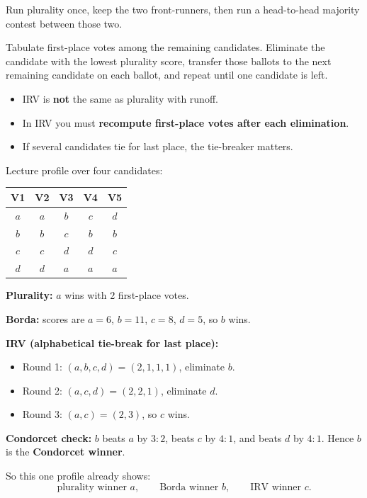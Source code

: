 \begin{defbox}
Run plurality once, keep the two front-runners, then run a head-to-head majority contest between those two.
\end{defbox}

\begin{defbox}
Tabulate first-place votes among the remaining candidates. Eliminate the candidate with the lowest plurality score, transfer those ballots to the next remaining candidate on each ballot, and repeat until one candidate is left.
\end{defbox}

\begin{tipbox}
\begin{itemize}
  \item IRV is \textbf{not} the same as plurality with runoff.
  \item In IRV you must \textbf{recompute first-place votes after each elimination}.
  \item If several candidates tie for last place, the tie-breaker matters.
\end{itemize}
\end{tipbox}

\begin{exbox}
Lecture profile over four candidates:

\begin{center}
\renewcommand{\arraystretch}{1.15}
\begin{tabular}{@{}ccccc@{}}
\toprule
\textbf{V1} & \textbf{V2} & \textbf{V3} & \textbf{V4} & \textbf{V5} \\
\midrule
$a$ & $a$ & $b$ & $c$ & $d$ \\
$b$ & $b$ & $c$ & $b$ & $b$ \\
$c$ & $c$ & $d$ & $d$ & $c$ \\
$d$ & $d$ & $a$ & $a$ & $a$ \\
\bottomrule
\end{tabular}
\end{center}

\textbf{Plurality:} $a$ wins with 2 first-place votes.

\textbf{Borda:} scores are $a=6$, $b=11$, $c=8$, $d=5$, so $b$ wins.

\textbf{IRV (alphabetical tie-break for last place):}
\begin{itemize}
  \item Round 1: $(a,b,c,d) = (2,1,1,1)$, eliminate $b$.
  \item Round 2: $(a,c,d) = (2,2,1)$, eliminate $d$.
  \item Round 3: $(a,c) = (2,3)$, so $c$ wins.
\end{itemize}

\textbf{Condorcet check:} $b$ beats $a$ by $3{:}2$, beats $c$ by $4{:}1$, and beats $d$ by $4{:}1$. Hence $b$ is the \textbf{Condorcet winner}.

So this one profile already shows:
\[
  \text{plurality winner } a,\qquad
  \text{Borda winner } b,\qquad
  \text{IRV winner } c.
\]
\end{exbox}

